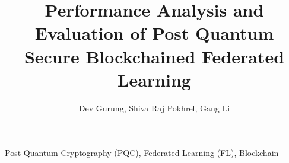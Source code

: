 \documentclass[lettersize,journal]{IEEEtran}
\begin{document}
%
%
\title{Performance Analysis and Evaluation of Post Quantum Secure Blockchained Federated
Learning
}

\author{Dev Gurung, Shiva Raj Pokhrel, Gang Li
}

\maketitle



\begin{IEEEkeywords}
Post Quantum Cryptography (PQC), Federated Learning (FL), Blockchain
\end{IEEEkeywords}





% 
% 
\end{document}
